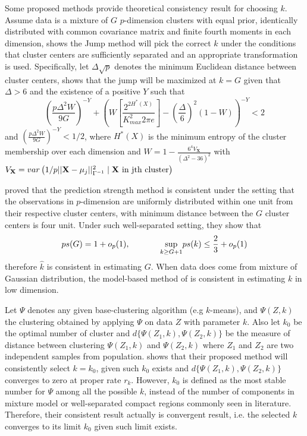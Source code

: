 \documentclass[12pt]{article}
\begin{document}
Some proposed methods provide theoretical consistency result for choosing $k$. 
Assume data is a mixture of $G$ $p$-dimension clusters with equal prior, identically distributed with 
common covariance matrix and finite fourth moments in each dimension, \citet{sugar2003finding} shows
the Jump method will pick the correct $k$ under the conditions that cluster centers are sufficiently
separated and an appropriate transformation is used. Specifically, let $\Delta\sqrt{p}$ denotes the 
minimum Euclidean distance between cluster centers, \citet{sugar2003finding} shows that the jump will
be maximized at $k=G$ given that $\Delta > 6$ and the existence of a positive $Y$ such that
\[	\left(\frac{p\Delta^2W}{9G}\right)^{-Y}+\left(W\left[\frac{2^{2H^*(X)}}{K^2_{max}2\pi e}\right]-(\frac{\Delta}{6})^2(1-W) \right)^{-Y} < 2	\]
and $\left(\frac{p\Delta^2W}{9G}\right)^{-Y} <1/2$, where $H^*(X)$ is the minimum entropy of the cluster 
membership over each dimension and $W =1- \frac{6^4V_{\mathbf{X}}}{(\Delta^2-36)^2}$ with $V_{\mathbf{X}} = var\left( 1/p ||\mathbf{X}-\mu_j||^2_{\Gamma^{-1}} \mid \mathbf{X} \hspace{0.05in}\text{in jth cluster}\right)$

\cite{tibshirani2005cluster} proved that the prediction strength method is consistent under the setting 
that the observations in $p$-dimension are uniformly distributed within one unit from their respective cluster centers, with minimum distance between the $G$ cluster centers is four unit. Under such well-separated setting, 
they show that 
\[ ps(G) = 1+ o_p(1), \hspace{0.5in} \underset{k \geq G+1}{\text{sup}} ps(k)\leq \frac{2}{3}+ o_p(1) \]
therefore $\hat{k}$ is consistent in estimating $G$.  
When data does come from mixture of Gaussian distribution, the model-based method of \citet{fraley2002model} is consistent in estimating $k$ in low dimension.

Let $\Psi$ denotes any given base-clustering algorithm (e.g $k$-means), and $\Psi(Z,k)$ the clustering obtained by applying $\Psi$ on data $Z$ with parameter $k$. Also let $k_0$ be the optimal number of cluster and $d\{\Psi(Z_1,k),\Psi(Z_2,k)\}$ be the measure of distance between clustering $\Psi(Z_1,k)$ and $\Psi(Z_2,k)$ where $Z_1$ and $Z_2$ are two independent samples from population. \citet{wang2010consistent} shows that their proposed method will consistently select $k = k_0$, given such $k_0$ exists and $d\{\Psi(Z_1,k),\Psi(Z_2,k)\}$ converges to zero at proper rate $r_k$. However, $k_0$ is defined as the most stable number for $\Psi$ among all the possible $k$, instead of the number of components in mixture model or well-separated compact regions commonly seen in literature. Therefore, their consistent result actually is convergent result, i.e. the selected $k$ converges to its limit $k_0$ given such limit exists.
\end{document}
